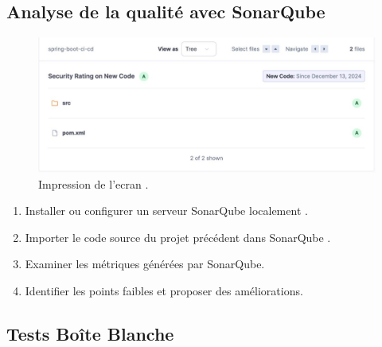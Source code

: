 \documentclass{article}
\begin{document}
\subsection{Analyse de la qualité avec SonarQube}
\begin{figure}[H]
  \centering
  \includegraphics[width=0.9\linewidth]{assets/IMG-20241215-WA0008.jpg}
  \caption{\label{fig:frog2} Impression de l'ecran .}
  \end{figure}
\begin{enumerate}
    \item Installer ou configurer un serveur SonarQube localement .
 
    \item Importer le code source du projet précédent dans SonarQube .
 
    
    \item Examiner les métriques générées par SonarQube.
   
    \item Identifier les points faibles et proposer des améliorations.
   
\end{enumerate}

\subsection{Tests Boîte Blanche}
\end{document}
